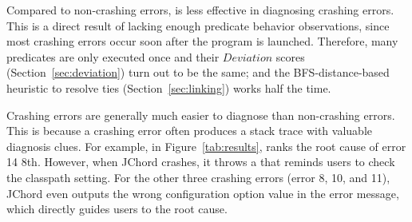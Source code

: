 
Compared to non-crashing errors, \ourtool is less effective
in diagnosing crashing errors.
This is a direct result of lacking enough predicate behavior observations,
since most crashing errors occur soon
after the program is launched. Therefore, many predicates are
only executed once and their $Deviation$ scores
 (Section~\ref{sec:deviation}) turn out to be the same; and the BFS-distance-based heuristic to resolve ties (Section~\ref{sec:linking})
works half the time.




Crashing errors are generally much easier to diagnose than non-crashing errors.
This is because a crashing error often produces a stack trace with valuable diagnosis clues.
For example, in Figure~\ref{tab:results}, \ourtool ranks the root cause of
error 14  8th.
However, when JChord crashes, it throws a 
that reminds users to check the classpath setting. For the other three crashing errors (error 8, 10, and 11),
JChord even outputs the wrong configuration option value in the
error message, which
directly guides users to the root cause. 









